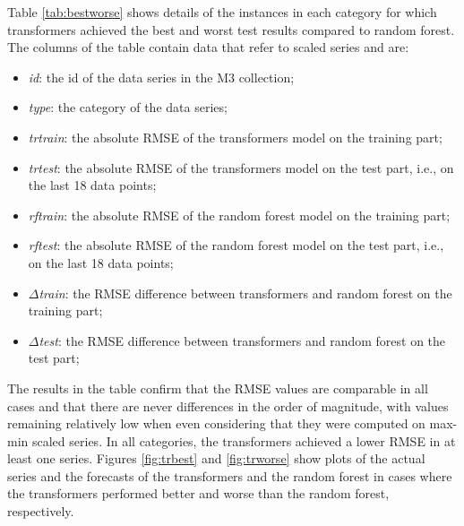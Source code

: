 \documentclass[algorithms,article,submit,pdftex,moreauthors]{Definitions/mdpi}
\begin{document}
Table \ref{tab:bestworse} shows details of the instances in each category for which transformers achieved the best and worst test results compared to random forest. The columns of the table contain data that refer to scaled series and are:
\begin{itemize}
	\item {\it id}: the id of the data series in the M3 collection;
	\item {\it type}: the category of the data series;
	\item {\it trtrain}: the absolute RMSE of the transformers model on the training part;
	\item {\it trtest}: the absolute RMSE of the transformers model on the test part, i.e., on the last 18 data points;
	\item {\it rftrain}: the absolute RMSE of the random forest model on the training part;
	\item {\it rftest}: the absolute RMSE of the random forest model on the test part, i.e., on the last 18 data points;
	\item {\it $\Delta$train}: the RMSE difference between transformers and random forest on the training part;
	\item {\it $\Delta$test}: the RMSE difference between transformers and random forest on the test part;
\end{itemize}

The results in the table confirm that the RMSE values are comparable in all cases and that there are never differences in the order of magnitude, with values remaining relatively low when even considering that they were computed on max-min scaled series. In all categories, the transformers achieved a lower RMSE in at least one series. Figures \ref{fig:trbest} and \ref{fig:trworse} show plots of the actual series and the forecasts of the transformers and the random forest in cases where the transformers performed better and worse than the random forest, respectively.
\end{document}
